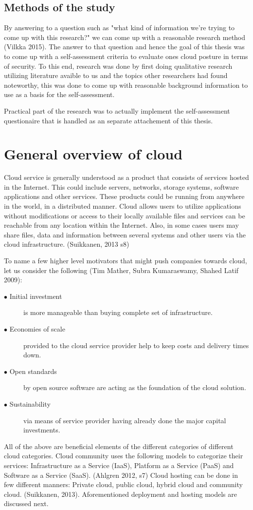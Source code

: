 \documentclass{article}
\begin{document}
\subsection{Methods of the study}
By answering to a question such as "what kind of information we're trying to come up with this research?" we can come up with a reasonable research method (Vilkka 2015).
The answer to that question and hence the goal of this thesis was to come up with a self-assessment criteria to evaluate ones cloud posture in terms of security.
To this end, research was done by first doing qualitative research utilizing literature avaible to us and the topics other researchers had found noteworthy, this was done to come up with reasonable background information to use as a basis for the self-assessment.
\par
Practical part of the research was to actually implement the self-assessment questionaire that is handled as an separate attachement of this thesis.
\section{General overview of cloud}
Cloud service is generally understood as a product that consists of services hosted in the Internet. This could include servers, networks, storage systems, software applications and other services. These products could be running from anywhere in the world, in a distributed manner. Cloud allows users to utilize applications without modifications or access to their locally available files and services can be reachable from any location within the Internet. Also, in some cases users may share files, data and information between several systems and other users via the cloud infrastructure.
(Suikkanen, 2013 s8)
\par
To name a few higher level motivators that might push companies towards cloud, let us consider the following (Tim Mather, Subra Kumaraswamy, Shahed Latif 2009):
\begin{description}
        \item[$\bullet$ Initial investment] is more manageable than buying complete set of infrastructure.
        \item[$\bullet$ Economies of scale] provided to the cloud service provider help to keep costs and delivery times down.
        \item[$\bullet$ Open standards] by open source software are acting as the foundation of the cloud solution.
        \item[$\bullet$ Sustainability] via means of service provider having already done the major capital investments.
\end{description}
All of the above are beneficial elements of the different categories of different cloud categories.
Cloud community uses the following models to categorize their services: Infrastructure as a Service (IaaS), Platform as a Service (PaaS) and Software as a Service (SaaS). (Ahlgren 2012, s7)
Cloud hosting can be done in few different manners: Private cloud, public cloud, hybrid cloud and community cloud. (Suikkanen, 2013).
Aforementioned deployment and hosting models are discussed next.
\end{document}
